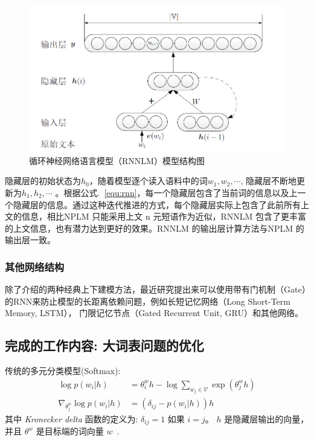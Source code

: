 \documentclass[master,openright,twoside,color]{buaathesis}
\begin{document}
\begin{figure}
  \centering
  \includegraphics[width=0.68\linewidth]{./figures/rnnlm.png}
  \caption{循环神经网络语言模型（RNNLM）模型结构图}\label{fig:rnnlm}
\end{figure}


隐藏层的初始状态为$h_0$，随着模型逐个读入语料中的词$w_1,w_2,\cdots$, 隐藏层不断地更新为$h_1,h_2,\cdots$ 。根据公式.~\ref{equ:rnn}，每一个隐藏层包含了当前词的信息以及上一个隐藏层的信息。通过这种迭代推进的方式，每个隐藏层实际上包含了此前所有上文的信息，相比NPLM 只能采用上文 n 元短语作为近似，RNNLM 包含了更丰富的上文信息，也有潜力达到更好的效果。RNNLM 的输出层计算方法与NPLM 的输出层一致。

\subsubsection{其他网络结构}
除了介绍的两种经典上下建模方法，最近研究提出来可以使用带有门机制（Gate）的RNN来防止模型的长距离依赖问题，例如长短记忆网络（Long Short-Term Memory, LSTM）， 门限记忆节点（Gated Recurrent Unit, GRU）和其他网络。

\subsection{完成的工作内容: 大词表问题的优化}
传统的多元分类模型(Softmax):
\begin{equation}
\label{eq:softmax}
\begin{split}
\log p(w_i|h) &= \theta^w_i h-\log \sum_{w_j\in \mathcal{V}}{\exp(\theta^w_j h)}\\
\nabla_{\theta^w_j}{\log p(w_i|h)}&= (\delta_{ij}-p(w_i|h))h
\end{split}
\end{equation}
其中 \textit{Kronecker delta} 函数的定义为: $\delta_{ij} = 1$ 如果 $i = j$。 $h$ 是隐藏层输出的向量，并且 $\theta^w$ 是目标端的词向量 $w$~\cite{duda2012pattern}.
\end{document}
